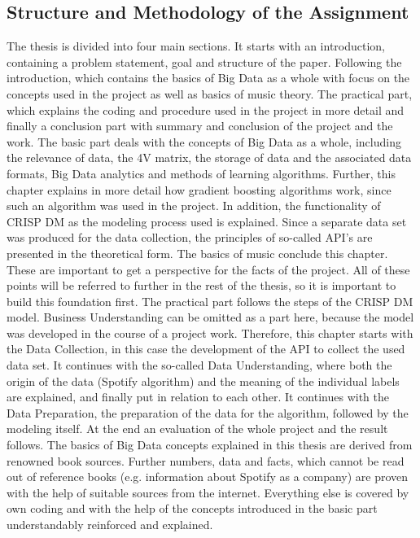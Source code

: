 \subsection{Structure and Methodology of the Assignment}
The thesis is divided into four main sections. It starts with an introduction, containing a problem statement, goal and structure of the paper. 
Following the introduction, which contains the basics of Big Data as a whole with focus on the concepts used in the project as well as basics of music theory. 
The practical part, which explains the coding and procedure used in the project in more detail and finally a conclusion part with summary and conclusion of the project and the work. 
The basic part deals with the concepts of Big Data as a whole, including the relevance of data, the 4V matrix, the storage of data and the associated data formats, 
Big Data analytics and methods of learning algorithms. Further, this chapter explains in more detail how gradient boosting algorithms work, 
since such an algorithm was used in the project. In addition, the functionality of CRISP DM as the modeling process used is explained. 
Since a separate data set was produced for the data collection, the principles of so-called API's are presented in the theoretical form. 
The basics of music conclude this chapter. These are important to get a perspective for the facts of the project. 
All of these points will be referred to further in the rest of the thesis, so it is important to build this foundation first.
The practical part follows the steps of the CRISP DM model. Business Understanding can be omitted as a part here, because the model was developed in the course of a project work. 
Therefore, this chapter starts with the Data Collection, in this case the development of the API to collect the used data set. 
It continues with the so-called Data Understanding, where both the origin of the data (Spotify algorithm) and the meaning of the individual labels are explained, 
and finally put in relation to each other. It continues with the Data Preparation, the preparation of the data for the algorithm, followed by the modeling itself. 
At the end an evaluation of the whole project and the result follows.
The basics of Big Data concepts explained in this thesis are derived from renowned book sources. 
Further numbers, data and facts, which cannot be read out of reference books (e.g. information about Spotify as a company) 
are proven with the help of suitable sources from the internet. Everything else is covered by own coding and with the help of the concepts introduced in the basic part 
understandably reinforced and explained. 
